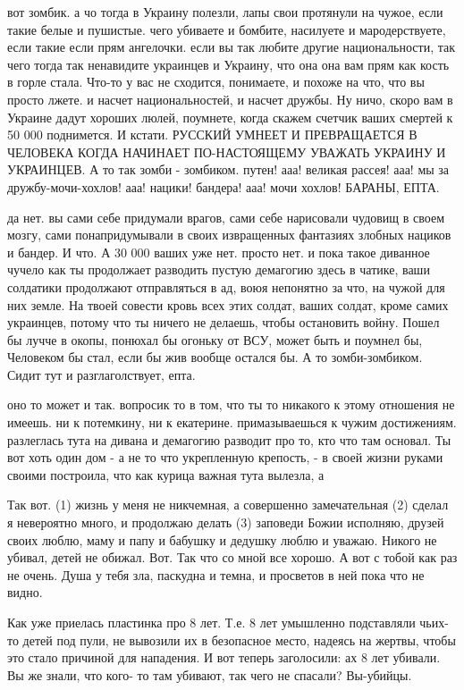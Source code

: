 вот зомбик. а чо тогда в Украину полезли, лапы свои протянули на чужое, если
такие белые и пушистые. чего убиваете и бомбите, насилуете и мародерствуете,
если такие если прям ангелочки. если вы так любите другие национальности, так
чего тогда так ненавидите украинцев и Украину, что она она вам прям как кость в
горле стала. Что-то у вас не сходится, понимаете, и похоже на что, что вы
просто лжете. и насчет национальностей, и насчет дружбы. Ну ничо, скоро вам в
Украине дадут хороших люлей, поумнете, когда скажем счетчик ваших смертей к 50
000 поднимется. И кстати. РУССКИЙ УМНЕЕТ И ПРЕВРАЩАЕТСЯ В ЧЕЛОВЕКА КОГДА
НАЧИНАЕТ ПО-НАСТОЯЩЕМУ УВАЖАТЬ УКРАИНУ И УКРАИНЦЕВ. А то так зомби - зомбиком.
путен! ааа! великая рассея! ааа! мы за дружбу-мочи-хохлов! ааа! нацики!
бандера! ааа! мочи хохлов! БАРАНЫ, ЕПТА.

да нет. вы сами себе придумали врагов, сами себе нарисовали чудовищ в своем
мозгу, сами понапридумывали в своих извращенных фантазиях злобных нациков и
бандер. И что. А 30 000 ваших уже нет. просто нет. и пока такое диванное чучело
как ты продолжает разводить пустую демагогию здесь в чатике, ваши солдатики
продолжают отправляться в ад, воюя непонятно за что, на чужой для них земле. На
твоей совести кровь всех этих солдат, ваших солдат, кроме самих украинцев,
потому что ты ничего не делаешь, чтобы остановить войну. Пошел бы лучче в
окопы, понюхал бы огоньку от ВСУ, может быть и поумнел бы, Человеком бы стал,
если бы жив вообще остался бы. А то зомби-зомбиком. Сидит тут и
разглаголствует, епта.

оно то может и так. вопросик то в том, что ты то никакого к этому отношения не
имеешь. ни к потемкину, ни к екатерине. примазываешься к чужим достижениям.
разлеглась тута на дивана и демагогию разводит про то, кто что там основал. Ты
вот хоть один дом - а не то что укрепленную крепость, - в своей жизни руками
своими построила, что как курица важная тута вылезла, а

Так вот. (1) жизнь у меня не никчемная, а совершенно замечательная (2) сделал я
невероятно много, и продолжаю делать (3) заповеди Божии исполняю, друзей своих
люблю, маму и папу и бабушку и дедушку люблю и уважаю. Никого не убивал, детей
не обижал. Вот. Так что со мной все хорошо. А вот с тобой как раз не очень.
Душа у тебя зла, паскудна и темна, и просветов в ней пока что не видно.

Как уже приелась пластинка про 8 лет. Т.е. 8 лет умышленно подставляли чьих-то
детей под пули, не вывозили их в безопасное место, надеясь на жертвы, чтобы это
стало причиной для нападения. И вот теперь заголосили: ах 8 лет убивали. Вы же
знали, что кого- то там убивают, так чего не спасали? Вы-убийцы.

